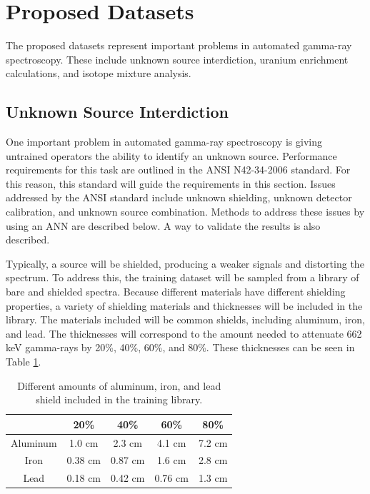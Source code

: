 \documentclass[tocnosub,noragright,centerchapter,12pt,fullpage]{uiucecethesis09}
\begin{document}
\section{Proposed Datasets} \label{ProposedDatasets}

The proposed datasets represent important problems in automated gamma-ray spectroscopy. These include unknown source interdiction, uranium enrichment calculations, and isotope mixture analysis. 

\subsection{Unknown Source Interdiction} \label{UnknownSourceInterdiction}

One important problem in automated gamma-ray spectroscopy is giving untrained operators the ability to identify an unknown source. Performance requirements for this task are outlined in the ANSI N42-34-2006 standard. For this reason, this standard will guide the requirements in this section. Issues addressed by the ANSI standard include unknown shielding, unknown detector calibration, and unknown source combination. Methods to address these issues by using an ANN are described below. A way to validate the results is also described. 

Typically, a source will be shielded, producing a weaker signals and distorting the spectrum. To address this, the training dataset will be sampled from a library of bare and shielded spectra. Because different materials have different shielding properties, a variety of shielding materials and thicknesses will be included in the library. The materials included will be common shields, including aluminum, iron, and lead. The thicknesses will correspond to the amount needed to attenuate 662 keV gamma-rays by 20\%, 40\%, 60\%, and 80\%. These thicknesses can be seen in Table \ref{table:Shielding_to_include}.

\begin{table}[H]
\centering
\caption{Different amounts of aluminum, iron, and lead shield included in the training library.}
\label{table:Shielding_to_include}
\begin{tabular}{c|c|c|c|c|}
\cline{2-5}
                               & 20\% & 40\% & 60\% & 80\% \\ \hline
\multicolumn{1}{|c|}{Aluminum} & 1.0 cm  & 2.3 cm  & 4.1 cm & 7.2 cm \\ \hline
\multicolumn{1}{|c|}{Iron}     & 0.38 cm  & 0.87 cm  & 1.6 cm & 2.8 cm  \\ \hline
\multicolumn{1}{|c|}{Lead}     & 0.18 cm  & 0.42 cm  & 0.76 cm  & 1.3 cm \\ \hline
\end{tabular}
\end{table}
\end{document}
